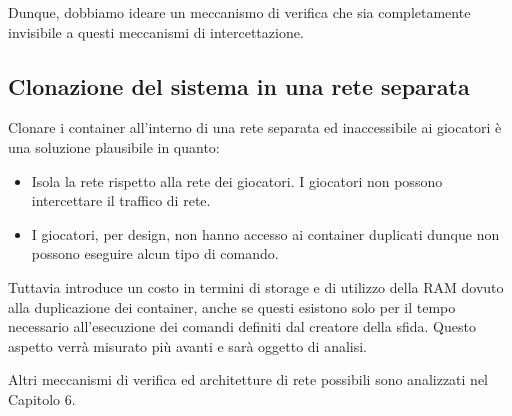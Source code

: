 Dunque, dobbiamo ideare un meccanismo di verifica che sia completamente
invisibile a questi meccanismi di intercettazione.

\subsection{Clonazione del sistema in una rete
separata}\label{clonazione-del-sistema-in-una-rete-separata}

Clonare i container all'interno di una rete separata ed inaccessibile ai
giocatori è una soluzione plausibile in quanto:

\begin{itemize}
\tightlist
\item
  Isola la rete rispetto alla rete dei giocatori. I giocatori non
  possono intercettare il traffico di rete.
\item
  I giocatori, per design, non hanno accesso ai container duplicati
  dunque non possono eseguire alcun tipo di comando.
\end{itemize}

Tuttavia introduce un costo in termini di storage e di utilizzo della
RAM dovuto alla duplicazione dei container, anche se questi esistono
solo per il tempo necessario all'esecuzione dei comandi definiti dal
creatore della sfida. Questo aspetto verrà misurato più avanti e sarà
oggetto di analisi.

Altri meccanismi di verifica ed architetture di rete possibili sono
analizzati nel Capitolo 6.
